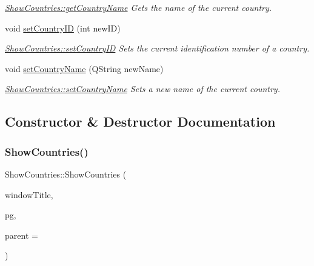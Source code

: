 \begin{DoxyCompactItemize}
\begin{DoxyCompactList}\small\item\em \mbox{\hyperlink{class_show_countries_afc6d5f6817bd4c9388aef3d52d09d768}{Show\+Countries\+::get\+Country\+Name}} Gets the name of the current country. \end{DoxyCompactList}\item 
void \mbox{\hyperlink{class_show_countries_a751b9d3c6859102f48d3ecc254135906}{set\+Country\+ID}} (int new\+ID)
\begin{DoxyCompactList}\small\item\em \mbox{\hyperlink{class_show_countries_a751b9d3c6859102f48d3ecc254135906}{Show\+Countries\+::set\+Country\+ID}} Sets the current identification number of a country. \end{DoxyCompactList}\item 
void \mbox{\hyperlink{class_show_countries_aefa9daeff484f4028ea5a280b280dd36}{set\+Country\+Name}} (Q\+String new\+Name)
\begin{DoxyCompactList}\small\item\em \mbox{\hyperlink{class_show_countries_aefa9daeff484f4028ea5a280b280dd36}{Show\+Countries\+::set\+Country\+Name}} Sets a new name of the current country. \end{DoxyCompactList}\end{DoxyCompactItemize}


\subsection{Constructor \& Destructor Documentation}
\mbox{\label{class_show_countries_a509e0b6ebeb2fb580e7985b81b3f77e6}} 
\subsubsection{\texorpdfstring{ShowCountries()}{ShowCountries()}}
{\footnotesize\ttfamily Show\+Countries\+::\+Show\+Countries (\begin{DoxyParamCaption}\item[{Q\+String}]{window\+Title,  }\item[{\mbox{\hyperlink{classpsql}{psql}} $\ast$}]{pg,  }\item[{Q\+Widget $\ast$}]{parent = {} }\end{DoxyParamCaption})\hspace{0.3cm}{\ttfamily [explicit]}}



